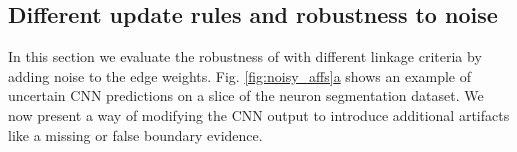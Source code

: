 



\subsection{Different update rules and robustness to noise}
 In this section we evaluate the robustness of \algname{} with different linkage criteria by adding noise to the edge weights.
Fig. \hyperref[fig:noisy_affs]{\ref*{fig:noisy_affs}a} shows an example of uncertain CNN predictions on a slice of the neuron segmentation dataset. We now present a way of modifying the CNN output to introduce additional artifacts like a missing or false boundary evidence. 

